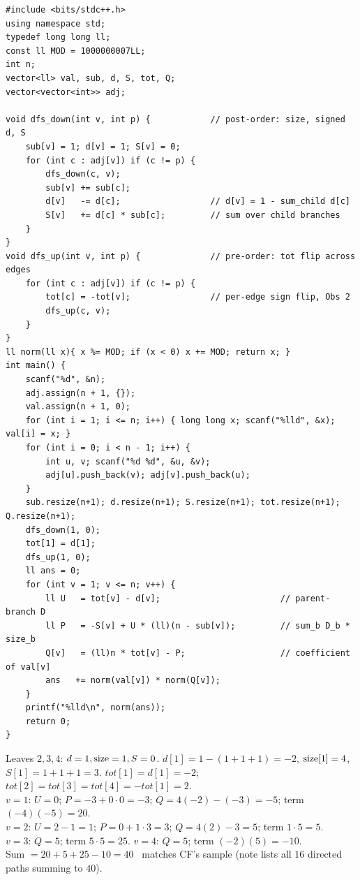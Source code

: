 \begin{lstlisting}[caption={Codeforces 960E -- signed-sum reroot (tot flip per edge) with the branch product aggregate; O(n), mod 1e9+7}, label={lst:c20-960e-soln}]
#include <bits/stdc++.h>
using namespace std;
typedef long long ll;
const ll MOD = 1000000007LL;
int n;
vector<ll> val, sub, d, S, tot, Q;
vector<vector<int>> adj;

void dfs_down(int v, int p) {            // post-order: size, signed d, S
    sub[v] = 1; d[v] = 1; S[v] = 0;
    for (int c : adj[v]) if (c != p) {
        dfs_down(c, v);
        sub[v] += sub[c];
        d[v]   -= d[c];                  // d[v] = 1 - sum_child d[c]
        S[v]   += d[c] * sub[c];         // sum over child branches
    }
}
void dfs_up(int v, int p) {              // pre-order: tot flip across edges
    for (int c : adj[v]) if (c != p) {
        tot[c] = -tot[v];                // per-edge sign flip, Obs 2
        dfs_up(c, v);
    }
}
ll norm(ll x){ x %= MOD; if (x < 0) x += MOD; return x; }
int main() {
    scanf("%d", &n);
    adj.assign(n + 1, {});
    val.assign(n + 1, 0);
    for (int i = 1; i <= n; i++) { long long x; scanf("%lld", &x); val[i] = x; }
    for (int i = 0; i < n - 1; i++) {
        int u, v; scanf("%d %d", &u, &v);
        adj[u].push_back(v); adj[v].push_back(u);
    }
    sub.resize(n+1); d.resize(n+1); S.resize(n+1); tot.resize(n+1); Q.resize(n+1);
    dfs_down(1, 0);
    tot[1] = d[1];
    dfs_up(1, 0);
    ll ans = 0;
    for (int v = 1; v <= n; v++) {
        ll U   = tot[v] - d[v];                        // parent-branch D
        ll P   = -S[v] + U * (ll)(n - sub[v]);         // sum_b D_b * size_b
        Q[v]   = (ll)n * tot[v] - P;                   // coefficient of val[v]
        ans   += norm(val[v]) * norm(Q[v]);
    }
    printf("%lld\n", norm(ans));
    return 0;
}
\end{lstlisting}

\begin{tracebox}[Official sample: $n=4$, values $(-4,1,5,-2)$, star centred at $1$ $\Rightarrow$ 40]
Leaves $2,3,4$: $d=1,\operatorname{size}=1,S=0$. $d[1]=1-(1{+}1{+}1)=-2$, $\operatorname{size}[1]=4$,
$S[1]=1{+}1{+}1=3$. $\mathit{tot}[1]=d[1]=-2$; $\mathit{tot}[2]=\mathit{tot}[3]=
\mathit{tot}[4]=-\mathit{tot}[1]=2$.\\
$v=1$: $U=0$; $P=-3+0\cdot0=-3$; $Q=4(-2)-(-3)=-5$; term $(-4)(-5)=20$.\\
$v=2$: $U=2-1=1$; $P=0+1\cdot3=3$; $Q=4(2)-3=5$; term $1\cdot5=5$.\\
$v=3$: $Q=5$; term $5\cdot5=25$. \quad $v=4$: $Q=5$; term $(-2)(5)=-10$.\\
Sum $=20+5+25-10=\boxed{40}$ \checkmark\ matches CF's sample (note lists all
$16$ directed paths summing to $40$).
\end{tracebox}

